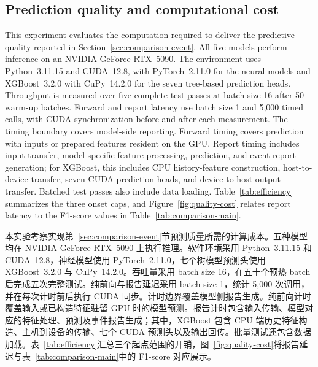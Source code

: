 \documentclass[a4paper,fleqn]{cas-dc}
\newcommand{\zhpara}[1]{%
  \par\begingroup\small\color{black!72}\noindent #1\par\endgroup}
\begin{document}
\subsection{Prediction quality and computational cost}\label{sec:efficiency}

This experiment evaluates the computation required to deliver the predictive quality reported in Section~\ref{sec:comparison-event}. All five models perform inference on an NVIDIA GeForce RTX~5090. The environment uses Python~3.11.15 and CUDA~12.8, with PyTorch~2.11.0 for the neural models and XGBoost~3.2.0 with CuPy~14.2.0 for the seven tree-based prediction heads. Throughput is measured over five complete test passes at batch size 16 after 50 warm-up batches. Forward and report latency use batch size 1 and 5,000 timed calls, with CUDA synchronization before and after each measurement. The timing boundary covers model-side reporting. Forward timing covers prediction with inputs or prepared features resident on the GPU. Report timing includes input transfer, model-specific feature processing, prediction, and event-report generation; for XGBoost, this includes CPU history-feature construction, host-to-device transfer, seven CUDA prediction heads, and device-to-host output transfer. Batched test passes also include data loading. Table~\ref{tab:efficiency} summarizes the three onset caps, and Figure~\ref{fig:quality-cost} relates report latency to the F1-score values in Table~\ref{tab:comparison-main}.

\zhpara{本实验考察实现第~\ref{sec:comparison-event}节预测质量所需的计算成本。五种模型均在 NVIDIA GeForce RTX~5090 上执行推理。软件环境采用 Python~3.11.15 和 CUDA~12.8，神经模型使用 PyTorch~2.11.0，七个树模型预测头使用 XGBoost~3.2.0 与 CuPy~14.2.0。吞吐量采用 batch size 16，在五十个预热 batch 后完成五次完整测试。纯前向与报告延迟采用 batch size 1，统计 5,000 次调用，并在每次计时前后执行 CUDA 同步。计时边界覆盖模型侧报告生成。纯前向计时覆盖输入或已构造特征驻留 GPU 时的模型预测。报告计时包含输入传输、模型对应的特征处理、预测及事件报告生成；其中，XGBoost 包含 CPU 端历史特征构造、主机到设备的传输、七个 CUDA 预测头以及输出回传。批量测试还包含数据加载。表~\ref{tab:efficiency}汇总三个起点范围的开销，图~\ref{fig:quality-cost}将报告延迟与表~\ref{tab:comparison-main}中的 F1-score 对应展示。}
\end{document}
